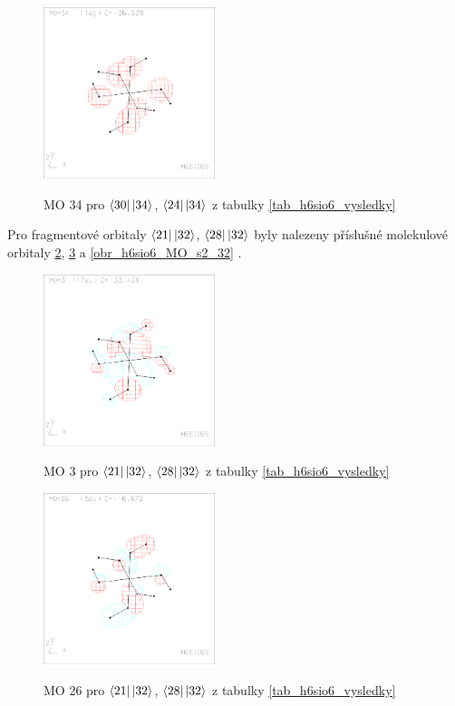 \documentclass[
  digital, %
  table,   %
  lof,     %
  lot,     %
]{fithesis3}
\begin{document}
\begin{figure}[h]
\caption{MO 34 pro $\bra{30}\ket{34}$, $\bra{24}\ket{34}$  z tabulky \ref{tab_h6sio6_vysledky}}
  \center
  \includegraphics[width=5cm]{h6sio6_obrazky/s1_34.eps}
  \label{obr_h6sio6_MO_s1_34}
  \end{figure}
  

Pro fragmentové orbitaly $\bra{21}\ket{32}$, $\bra{28}\ket{32}$ byly nalezeny příslušné molekulové orbitaly \ref{obr_h6sio6_MO_s2_3}, \ref{obr_h6sio6_MO_s2_26} a \ref{obr_h6sio6_MO_s2_32} .
  
  \begin{figure}[h]
\caption{MO 3 pro $\bra{21}\ket{32}$, $\bra{28}\ket{32}$  z tabulky \ref{tab_h6sio6_vysledky}}
  \center
  \includegraphics[width=5cm]{h6sio6_obrazky/s2_3.eps}
  \label{obr_h6sio6_MO_s2_3}
  \end{figure}
 
 \begin{figure}[h]
\caption{MO 26 pro $\bra{21}\ket{32}$, $\bra{28}\ket{32}$ z tabulky \ref{tab_h6sio6_vysledky}}
  \center
  \includegraphics[width=5cm]{h6sio6_obrazky/s2_26.eps}
  \label{obr_h6sio6_MO_s2_26}
  \end{figure}
\end{document}
